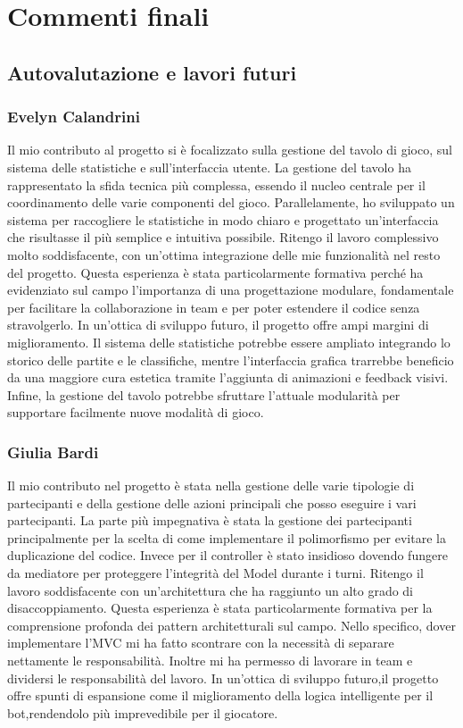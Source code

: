 \documentclass[a4paper,12pt]{report}
\begin{document}
\chapter{Commenti finali}

\section{Autovalutazione e lavori futuri}

\subsection*{Evelyn Calandrini}
Il mio contributo al progetto si è focalizzato sulla gestione del tavolo di gioco, sul sistema delle statistiche e sull'interfaccia utente. La gestione del tavolo ha rappresentato la sfida tecnica più complessa, essendo il nucleo centrale per il coordinamento delle varie componenti del gioco. 
Parallelamente, ho sviluppato un sistema per raccogliere le statistiche in modo chiaro e progettato un'interfaccia che risultasse il più semplice e intuitiva possibile.
Ritengo il lavoro complessivo molto soddisfacente, con un'ottima integrazione delle mie funzionalità nel resto del progetto. 
Questa esperienza è stata particolarmente formativa perché ha evidenziato sul campo l'importanza di una progettazione modulare, fondamentale per facilitare la collaborazione in team e per poter estendere il codice senza stravolgerlo.
In un'ottica di sviluppo futuro, il progetto offre ampi margini di miglioramento. Il sistema delle statistiche potrebbe essere ampliato integrando lo storico delle partite e le classifiche, mentre l'interfaccia grafica trarrebbe beneficio da una maggiore cura estetica tramite l'aggiunta di animazioni e feedback visivi.
Infine, la gestione del tavolo potrebbe sfruttare l'attuale modularità per supportare facilmente nuove modalità di gioco.

\subsection*{Giulia Bardi}
Il mio contributo nel progetto è stata nella gestione delle varie tipologie di partecipanti e della gestione delle azioni principali che posso eseguire i vari partecipanti.
La parte più impegnativa è stata la gestione dei partecipanti principalmente per la scelta di come implementare il polimorfismo per evitare la duplicazione del codice.
Invece per il controller è stato insidioso dovendo fungere da mediatore per proteggere l'integrità del Model durante i turni.
Ritengo il lavoro soddisfacente con un'architettura che ha raggiunto un alto grado di disaccoppiamento.
Questa esperienza è stata particolarmente formativa per la comprensione profonda dei pattern architetturali sul campo. Nello specifico, dover implementare l'MVC mi ha fatto scontrare con la necessità di separare nettamente le responsabilità.
Inoltre mi ha permesso di lavorare in team e dividersi le responsabilità del lavoro.
In un'ottica di sviluppo futuro,il progetto offre spunti di espansione come il miglioramento della logica intelligente per il bot,rendendolo più imprevedibile per il giocatore.
\end{document}
